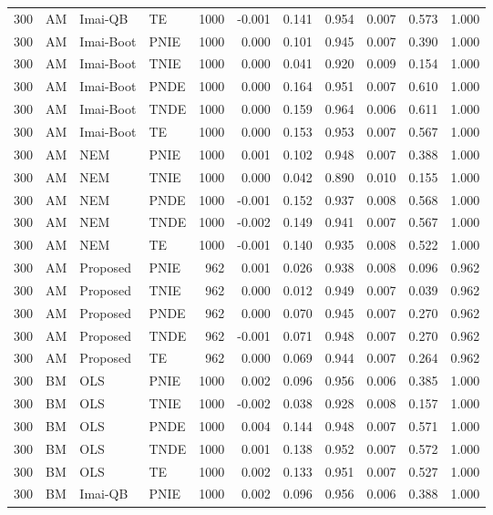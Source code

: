 \begin{longtable}{rlllrrrrrrr}
300 & AM & Imai-QB & TE & 1000 & -0.001 & 0.141 & 0.954 & 0.007 & 0.573 & 1.000 \\
300 & AM & Imai-Boot & PNIE & 1000 & 0.000 & 0.101 & 0.945 & 0.007 & 0.390 & 1.000 \\
300 & AM & Imai-Boot & TNIE & 1000 & 0.000 & 0.041 & 0.920 & 0.009 & 0.154 & 1.000 \\
300 & AM & Imai-Boot & PNDE & 1000 & 0.000 & 0.164 & 0.951 & 0.007 & 0.610 & 1.000 \\
300 & AM & Imai-Boot & TNDE & 1000 & 0.000 & 0.159 & 0.964 & 0.006 & 0.611 & 1.000 \\
300 & AM & Imai-Boot & TE & 1000 & 0.000 & 0.153 & 0.953 & 0.007 & 0.567 & 1.000 \\
300 & AM & NEM & PNIE & 1000 & 0.001 & 0.102 & 0.948 & 0.007 & 0.388 & 1.000 \\
300 & AM & NEM & TNIE & 1000 & 0.000 & 0.042 & 0.890 & 0.010 & 0.155 & 1.000 \\
300 & AM & NEM & PNDE & 1000 & -0.001 & 0.152 & 0.937 & 0.008 & 0.568 & 1.000 \\
300 & AM & NEM & TNDE & 1000 & -0.002 & 0.149 & 0.941 & 0.007 & 0.567 & 1.000 \\
300 & AM & NEM & TE & 1000 & -0.001 & 0.140 & 0.935 & 0.008 & 0.522 & 1.000 \\
300 & AM & Proposed & PNIE & 962 & 0.001 & 0.026 & 0.938 & 0.008 & 0.096 & 0.962 \\
300 & AM & Proposed & TNIE & 962 & 0.000 & 0.012 & 0.949 & 0.007 & 0.039 & 0.962 \\
300 & AM & Proposed & PNDE & 962 & 0.000 & 0.070 & 0.945 & 0.007 & 0.270 & 0.962 \\
300 & AM & Proposed & TNDE & 962 & -0.001 & 0.071 & 0.948 & 0.007 & 0.270 & 0.962 \\
300 & AM & Proposed & TE & 962 & 0.000 & 0.069 & 0.944 & 0.007 & 0.264 & 0.962 \\
300 & BM & OLS & PNIE & 1000 & 0.002 & 0.096 & 0.956 & 0.006 & 0.385 & 1.000 \\
300 & BM & OLS & TNIE & 1000 & -0.002 & 0.038 & 0.928 & 0.008 & 0.157 & 1.000 \\
300 & BM & OLS & PNDE & 1000 & 0.004 & 0.144 & 0.948 & 0.007 & 0.571 & 1.000 \\
300 & BM & OLS & TNDE & 1000 & 0.001 & 0.138 & 0.952 & 0.007 & 0.572 & 1.000 \\
300 & BM & OLS & TE & 1000 & 0.002 & 0.133 & 0.951 & 0.007 & 0.527 & 1.000 \\
300 & BM & Imai-QB & PNIE & 1000 & 0.002 & 0.096 & 0.956 & 0.006 & 0.388 & 1.000 \\

\end{longtable}
